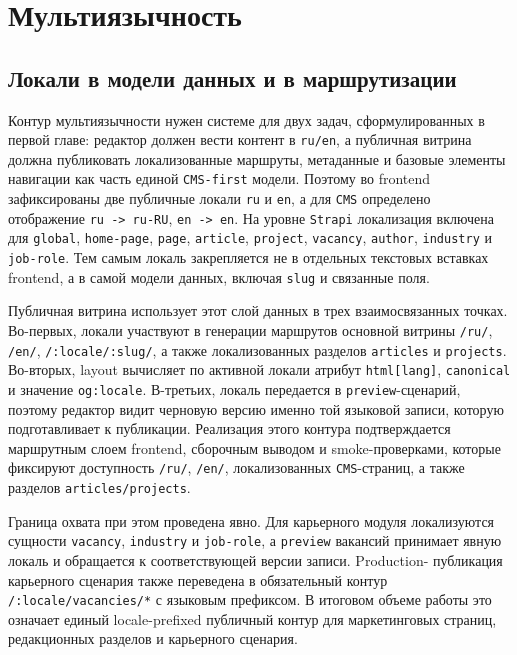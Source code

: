 \section{Мультиязычность}

\subsection{Локали в модели данных и в маршрутизации}

Контур мультиязычности нужен системе для двух задач, сформулированных в первой главе:
редактор должен вести контент в \texttt{ru/en}, а публичная витрина должна публиковать
локализованные маршруты, метаданные и базовые элементы навигации как часть единой
\texttt{CMS-first} модели. Поэтому во frontend зафиксированы две публичные локали
\texttt{ru} и \texttt{en}, а для \texttt{CMS} определено отображение
\texttt{ru -> ru-RU}, \texttt{en -> en}. На уровне \texttt{Strapi} локализация включена
для \texttt{global}, \texttt{home-page}, \texttt{page}, \texttt{article},
\texttt{project}, \texttt{vacancy}, \texttt{author}, \texttt{industry} и
\texttt{job-role}. Тем самым локаль закрепляется не в отдельных текстовых вставках
frontend, а в самой модели данных, включая \texttt{slug} и связанные поля.

Публичная витрина использует этот слой данных в трех взаимосвязанных точках. Во-первых,
локали участвуют в генерации маршрутов основной витрины \texttt{/ru/}, \texttt{/en/},
\texttt{/:locale/:slug/}, а также локализованных разделов \texttt{articles} и
\texttt{projects}. Во-вторых, layout вычисляет по активной локали атрибут
\texttt{html[lang]}, \texttt{canonical} и значение \texttt{og:locale}. В-третьих,
локаль передается в \texttt{preview}-сценарий, поэтому редактор видит черновую версию
именно той языковой записи, которую подготавливает к публикации. Реализация этого
контура подтверждается маршрутным слоем frontend, сборочным выводом и smoke-проверками,
которые фиксируют доступность \texttt{/ru/}, \texttt{/en/}, локализованных
\texttt{CMS}-страниц, а также разделов \texttt{articles/projects}.

Граница охвата при этом проведена явно. Для карьерного модуля локализуются сущности
\texttt{vacancy}, \texttt{industry} и \texttt{job-role}, а \texttt{preview} вакансий
принимает явную локаль и обращается к соответствующей версии записи. Production-
публикация карьерного сценария также переведена в обязательный контур
\texttt{/:locale/vacancies/*} с языковым префиксом. В итоговом объеме работы это
означает единый locale-prefixed публичный контур для маркетинговых страниц,
редакционных разделов и карьерного сценария.

